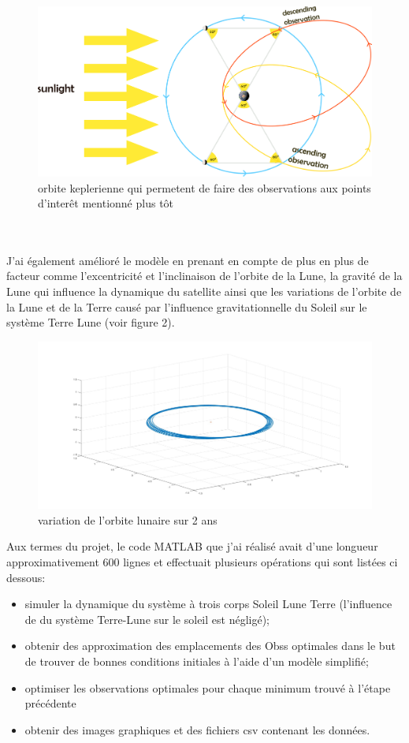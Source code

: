 \documentclass[12pt]{article} %
\begin{document}
		
		\begin{figure}[h]
			\includegraphics[width=18cm]{images/observations_main.png}
			\caption{orbite keplerienne qui permetent de faire des observations aux points d'interêt mentionné plus tôt}
		\end{figure}
		\\ \\
		J'ai également amélioré le modèle en prenant en compte de plus en plus de facteur comme l'excentricité et l'inclinaison de l'orbite de la Lune, la gravité de la Lune qui influence la dynamique du satellite ainsi que les variations de l'orbite de la Lune et de la Terre causé par l'influence gravitationnelle du Soleil sur le système Terre Lune (voir figure 2).
		\begin{figure}[h]
			\includegraphics[width=1\textwidth]{images/moon_orbit.jpg}
			\caption{variation de l'orbite lunaire sur 2 ans}
		\end{figure}
		
		Aux termes du projet, le code MATLAB que j'ai réalisé avait d'une longueur approximativement 600 lignes et effectuait plusieurs opérations qui sont listées ci dessous: 
		
		\begin{itemize}
			\item simuler la dynamique du système à trois corps Soleil Lune Terre (l'influence de du système Terre-Lune sur le soleil est négligé);
			\item obtenir des approximation des emplacements des \glspl{Obs} optimales dans le but de trouver de bonnes conditions initiales à l'aide d'un modèle simplifié;
			\item optimiser les observations optimales pour chaque minimum trouvé à l'étape précédente
			\item obtenir des images graphiques et des fichiers csv contenant les données.
		\end{itemize}
		
\end{document}
